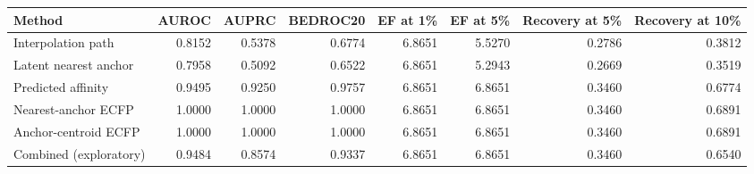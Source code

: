 \begin{tabular}{lrrrrrrr}
\toprule
Method & AUROC & AUPRC & BEDROC20 & EF at 1\% & EF at 5\% & Recovery at 5\% & Recovery at 10\% \\
\midrule
Interpolation path & 0.8152 & 0.5378 & 0.6774 & 6.8651 & 5.5270 & 0.2786 & 0.3812 \\
Latent nearest anchor & 0.7958 & 0.5092 & 0.6522 & 6.8651 & 5.2943 & 0.2669 & 0.3519 \\
Predicted affinity & 0.9495 & 0.9250 & 0.9757 & 6.8651 & 6.8651 & 0.3460 & 0.6774 \\
Nearest-anchor ECFP & 1.0000 & 1.0000 & 1.0000 & 6.8651 & 6.8651 & 0.3460 & 0.6891 \\
Anchor-centroid ECFP & 1.0000 & 1.0000 & 1.0000 & 6.8651 & 6.8651 & 0.3460 & 0.6891 \\
Combined (exploratory) & 0.9484 & 0.8574 & 0.9337 & 6.8651 & 6.8651 & 0.3460 & 0.6540 \\
\bottomrule
\end{tabular}
